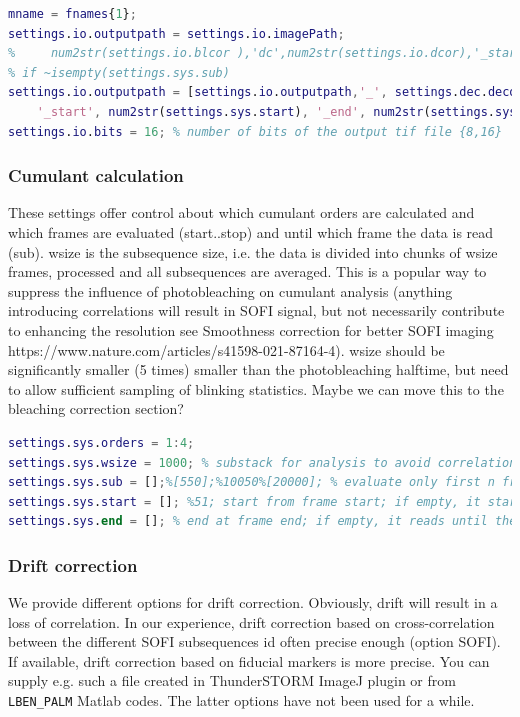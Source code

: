 \documentclass[final]{scrartcl}
\begin{document}
\begin{lstlisting}[language=Matlab]
% OUTPUT SETTINGS 
mname = fnames{1};
settings.io.outputpath = settings.io.imagePath; 
%     num2str(settings.io.blcor ),'dc',num2str(settings.io.dcor),'_start',num2str(settings.sys.start)];% output folder for results
% if ~isempty(settings.sys.sub)
settings.io.outputpath = [settings.io.outputpath,'_', settings.dec.deconv_method,'_FWHM', num2str(settings.dec.fwhm), '_iter',num2str(settings.dec.iter),'_recon',num2str(settings.dec.reconvolve), '_wsize', num2str(settings.sys.wsize), ...
    '_start', num2str(settings.sys.start), '_end', num2str(settings.sys.end)];    
settings.io.bits = 16; % number of bits of the output tif file {8,16}
\end{lstlisting}

\subsubsection*{Cumulant calculation}
These settings offer control about which cumulant orders are calculated and which frames are evaluated (start..stop) and until which frame the data is read (sub). wsize is the subsequence size, i.e. the data is divided into chunks of wsize frames, processed and all subsequences are averaged. This is a popular way to suppress the influence of photobleaching on cumulant analysis (anything introducing correlations will result in SOFI signal, but not necessarily contribute to enhancing the resolution see Smoothness correction for better SOFI imaging https://www.nature.com/articles/s41598-021-87164-4). wsize should be significantly smaller (5 times) smaller than the photobleaching halftime, but need to allow sufficient sampling of blinking statistics. Maybe we can move this to the bleaching correction section?

\begin{lstlisting}[language=Matlab]
% Cumulant calculation settings
settings.sys.orders = 1:4;
settings.sys.wsize = 1000; % substack for analysis to avoid correlations from bleaching etc
settings.sys.sub = [];%[550];%10050%[20000]; % evaluate only first n frames (for quick preview)
settings.sys.start = []; %51; start from frame start; if empty, it starts from the first frame
settings.sys.end = []; % end at frame end; if empty, it reads until the last frame
\end{lstlisting}

\subsubsection*{Drift correction}
We provide different options for drift correction. Obviously, drift will result in a loss of correlation. In our experience, drift correction based on cross-correlation between the different SOFI subsequences id often precise enough (option SOFI). If available, drift correction based on fiducial markers is more precise. You can supply e.g. such a file created in ThunderSTORM ImageJ plugin or from \lstinline{LBEN_PALM} Matlab codes. The latter options have not been used for a while.
\end{document}
